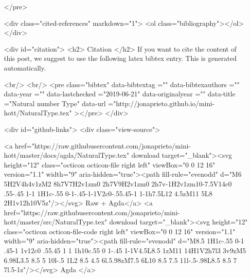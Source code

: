 </pre>


  <div class="cited-references" markdown="1">
  <ol class="bibliography"></ol>
  </div>


  
  <div id="citation">
  <h2> Citation </h2>
  If you want to cite the content of this post,
  we suggest to use the following latex bibtex entry.
  This is generated automatically.

  <br/>
  <br/>
  <pre class="bibtex"
       data-bibtextag =""
       data-bibtexauthors =""
       data-year =""
       data-lastchecked ="2019-06-21"
       data-originalyear =""
       data-title ="Natural number Type"
       data-url ="http://jonaprieto.github.io/mini-hott/NaturalType.tex"
  ></pre>
  </div>
  

  <div id="github-links">
    <div class="view-source">
      
        <a href="https://raw.githubusercontent.com/jonaprieto/mini-hott/master/docs/agda/NaturalType.tex" download target="_blank"><svg height="12" class="octicon octicon-file right left" viewBox="0 0 12 16" version="1.1" width="9" aria-hidden="true"><path fill-rule="evenodd" d="M6 5H2V4h4v1zM2 8h7V7H2v1zm0 2h7V9H2v1zm0 2h7v-1H2v1zm10-7.5V14c0 .55-.45 1-1 1H1c-.55 0-1-.45-1-1V2c0-.55.45-1 1-1h7.5L12 4.5zM11 5L8 2H1v12h10V5z"/></svg> Raw + Agda</a>
        <a href="https://raw.githubusercontent.com/jonaprieto/mini-hott/master/src/NaturalType.tex" download target="_blank"><svg height="12" class="octicon octicon-file-code right left" viewBox="0 0 12 16" version="1.1" width="9" aria-hidden="true"><path fill-rule="evenodd" d="M8.5 1H1c-.55 0-1 .45-1 1v12c0 .55.45 1 1 1h10c.55 0 1-.45 1-1V4.5L8.5 1zM11 14H1V2h7l3 3v9zM5 6.98L3.5 8.5 5 10l-.5 1L2 8.5 4.5 6l.5.98zM7.5 6L10 8.5 7.5 11l-.5-.98L8.5 8.5 7 7l.5-1z"/></svg> Agda </a>
      

